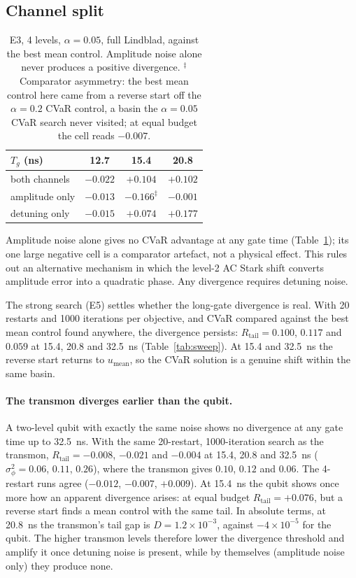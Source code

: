 \documentclass[aps,pra,onecolumn,notitlepage,superscriptaddress,nofootinbib,floatfix]{revtex4-2}
\newcommand{\Rt}{R_{\mathrm{tail}}}
\newcommand{\umean}{u_{\mathrm{mean}}}
\begin{document}
\subsection{Channel split}
\label{sec:channelsplit}
\begin{table}[htbp]
\centering\small
\begin{tabular}{@{}lccc@{}}
\toprule
$T_g$ (ns) & 12.7 & 15.4 & 20.8\\
\midrule
both channels & $-0.022$ & $+0.104$ & $+0.102$\\
amplitude only & $-0.013$ & $-0.166^{\ddagger}$ & $-0.001$\\
detuning only & $-0.015$ & $+0.074$ & $+0.177$\\
\bottomrule
\end{tabular}
\caption{E3, 4 levels, $\alpha=0.05$, full Lindblad, against the best mean
control. Amplitude noise alone never produces a positive divergence.
$^{\ddagger}$Comparator asymmetry: the best mean control here came from a
reverse start off the $\alpha=0.2$ CVaR control, a basin the $\alpha=0.05$
CVaR search never visited; at equal budget the cell reads $-0.007$.}
\label{tab:channel}
\end{table}

Amplitude noise alone gives no CVaR advantage at any gate time
(Table~\ref{tab:channel}); its one large negative cell is a comparator
artefact, not a physical effect. This rules out an alternative mechanism in which
the level-2 AC Stark shift converts amplitude error into a quadratic phase.
Any divergence requires detuning noise.

The strong search (E5) settles whether the long-gate divergence is real.
With 20 restarts and 1000 iterations per objective, and CVaR compared against
the best mean control found anywhere, the divergence persists: $\Rt=0.100$, $0.117$ and $0.059$ at
15.4, 20.8 and 32.5~ns (Table~\ref{tab:sweep}). At 15.4 and 32.5~ns the
reverse start returns to $\umean$, so the CVaR solution is a genuine shift
within the same basin.

\paragraph{The transmon diverges earlier than the qubit.} A two-level qubit
with exactly the same noise shows no divergence at any gate time up to
32.5~ns. With the same 20-restart, 1000-iteration search as the transmon,
$\Rt=-0.008$, $-0.021$ and $-0.004$ at 15.4, 20.8 and 32.5~ns
($\sigma_\phi^2=0.06$, $0.11$, $0.26$), where the transmon gives $0.10$,
$0.12$ and $0.06$. The 4-restart runs agree ($-0.012$, $-0.007$, $+0.009$).
At 15.4~ns the qubit shows once more how an apparent divergence arises: at
equal budget $\Rt=+0.076$, but a reverse start finds a mean control with the
same tail. In absolute terms, at 20.8~ns the transmon's
tail gap is $D=1.2\times10^{-3}$, against $-4\times10^{-5}$ for the qubit. The
higher transmon levels therefore lower the divergence threshold and amplify
it once detuning noise is present, while by themselves (amplitude noise only)
they produce none.
\end{document}

